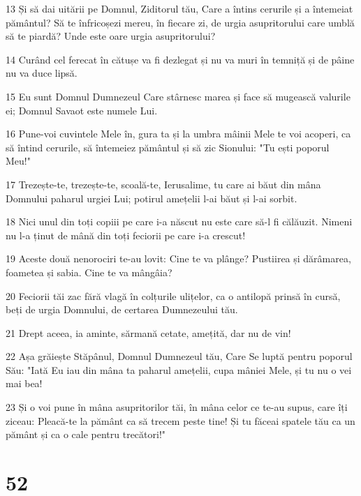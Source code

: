 \par 13 Și să dai uitării pe Domnul, Ziditorul tău, Care a întins cerurile și a întemeiat pământul? Să te înfricoșezi mereu, în fiecare zi, de urgia asupritorului care umblă să te piardă? Unde este oare urgia asupritorului?
\par 14 Curând cel ferecat în cătușe va fi dezlegat și nu va muri în temniță și de pâine nu va duce lipsă.
\par 15 Eu sunt Domnul Dumnezeul Care stârnesc marea și face să mugească valurile ei; Domnul Savaot este numele Lui.
\par 16 Pune-voi cuvintele Mele în, gura ta și la umbra mâinii Mele te voi acoperi, ca să întind cerurile, să întemeiez pământul și să zic Sionului: "Tu ești poporul Meu!"
\par 17 Trezește-te, trezește-te, scoală-te, Ierusalime, tu care ai băut din mâna Domnului paharul urgiei Lui; potirul amețelii l-ai băut și l-ai sorbit.
\par 18 Nici unul din toți copiii pe care i-a născut nu este care să-l fi călăuzit. Nimeni nu l-a ținut de mână din toți feciorii pe care i-a crescut!
\par 19 Aceste două nenorociri te-au lovit: Cine te va plânge? Pustiirea și dărâmarea, foametea și sabia. Cine te va mângâia?
\par 20 Feciorii tăi zac fără vlagă în colțurile ulițelor, ca o antilopă prinsă în cursă, beți de urgia Domnului, de certarea Dumnezeului tău.
\par 21 Drept aceea, ia aminte, sărmană cetate, amețită, dar nu de vin!
\par 22 Așa grăiește Stăpânul, Domnul Dumnezeul tău, Care Se luptă pentru poporul Său: "Iată Eu iau din mâna ta paharul amețelii, cupa mâniei Mele, și tu nu o vei mai bea!
\par 23 Și o voi pune în mâna asupritorilor tăi, în mâna celor ce te-au supus, care îți ziceau: Pleacă-te la pământ ca să trecem peste tine! Și tu făceai spatele tău ca un pământ și ca o cale pentru trecători!"

\chapter{52}

